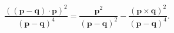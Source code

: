 \begin{equation}
\frac{\left( \left( \mathbf{p}-\mathbf{q}\right) \cdot \mathbf{p}\right) ^{2}%
}{\left( \mathbf{p}-\mathbf{q}\right) ^{4}}=\frac{\mathbf{p}^{2}}{\left( 
\mathbf{p}-\mathbf{q}\right) ^{2}}-\frac{\left( \mathbf{p}\times \mathbf{q}%
\right) ^{2}}{\left( \mathbf{p}-\mathbf{q}\right) ^{4}}.
\end{equation}

